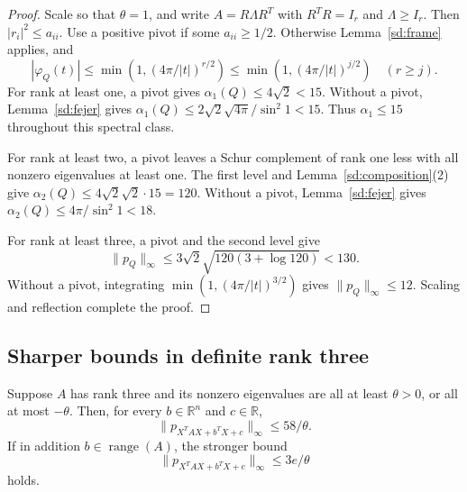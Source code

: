 \begin{proof}
Scale so that $\theta=1$, and write $A=R\Lambda R^T$ with
$R^TR=I_r$ and $\Lambda\geq I_r$.  Then $|r_i|^2\leq a_{ii}$.
Use a positive pivot if some $a_{ii}\geq1/2$.
Otherwise Lemma~\ref{sd:frame} applies, and
\[
 |\varphi_Q(t)|
 \leq\min(1,(4\pi/|t|)^{r/2})
 \leq\min(1,(4\pi/|t|)^{j/2})\quad(r\geq j).
\]
For rank at least one, a pivot gives $\alpha_1(Q)\leq4\sqrt2<15$.
Without a pivot, Lemma~\ref{sd:fejer} gives
$\alpha_1(Q)\leq2\sqrt2\sqrt{4\pi}/\sin^2 1<15$.
Thus $\alpha_1\leq15$ throughout this spectral class.

For rank at least two, a pivot leaves a Schur complement of rank
one less with all nonzero eigenvalues at least one.
The first level and Lemma~\ref{sd:composition}(2) give
$\alpha_2(Q)\leq4\sqrt2\sqrt2\cdot15=120$.
Without a pivot, Lemma~\ref{sd:fejer} gives
$\alpha_2(Q)\leq4\pi/\sin^2 1<18$.

For rank at least three, a pivot and the second level give
\[
 \|p_Q\|_\infty\leq3\sqrt2\sqrt{120(3+\log120)}<130.
\]
Without a pivot, integrating
$\min(1,(4\pi/|t|)^{3/2})$ gives $\|p_Q\|_\infty\leq12$.
Scaling and reflection complete the proof.
\end{proof}

\subsection{Sharper bounds in definite rank three}

\begin{theorem}\label{sd:rank-three}
Suppose $A$ has rank three and its nonzero eigenvalues are all
at least $\theta>0$, or all at most $-\theta$.  Then, for every
$b\in\mathbb R^n$ and $c\in\mathbb R$,
\begin{equation}\label{sd:rank-three-bound}
 \|p_{X^TAX+b^TX+c}\|_\infty\leq58/\theta.
\end{equation}
If in addition $b\in\operatorname{range}(A)$, the stronger bound
\begin{equation}\label{sd:rank-three-range}
 \|p_{X^TAX+b^TX+c}\|_\infty\leq3e/\theta
\end{equation}
holds.
\end{theorem}

